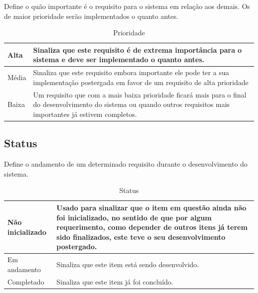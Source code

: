 Define o quão importante é o requisito para o sistema em relação aos demais. Os de maior prioridade serão implementados o quanto antes.

\begin{table}[!h]
\centering
\caption{Prioridade}
\label{attr_prioridade}
\begin{tabular}{|p{2cm}|p{8cm}|}
\hline
Alta  & Sinaliza que este requisito é de extrema importância para o sistema e deve ser implementado o quanto antes.                                                            \\ \hline
Média & Sinaliza que este requisito embora importante ele pode ter a sua implementação postergada em favor de um requisito de alta prioridade                                  \\ \hline
Baixa & Um requisito que com a mais baixa prioridade ficará mais para o final do desenvolvimento do sistema ou quando outros requisitos mais importantes já estivem completos. \\ \hline
\end{tabular}
\end{table}

\subsection{Status}

Define o andamento de um determinado requisito durante o desenvolvimento do sistema.

\begin{table}[!h]
\centering
\caption{Status}
\label{attr_Status}
\begin{tabular}{|p{3cm}|p{8cm}|}
\hline
Não inicializado & Usado para sinalizar que o item em questão ainda não foi inicializado, no sentido de que por algum requerimento, como depender de outros itens já terem sido finalizados, este teve o seu desenvolvimento postergado. \\ \hline
Em andamento     & Sinaliza que este item está sendo desenvolvido.                                                                                                                                                                       \\ \hline
Completado       & Sinaliza que este item já foi concluído.                                                                                                                                                                              \\ \hline
\end{tabular}
\end{table}

